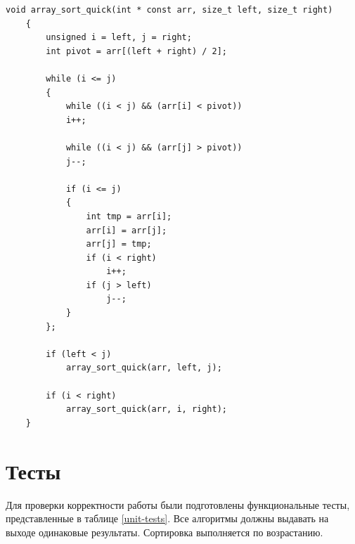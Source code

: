 \documentclass[12pt, a4paper]{report}
\begin{document}
	\begin{lstlisting}[label=code-quick,caption=Быстрая сортировка]
	void array_sort_quick(int * const arr, size_t left, size_t right)
	{
		unsigned i = left, j = right;
		int pivot = arr[(left + right) / 2];
		
		while (i <= j)
		{
			while ((i < j) && (arr[i] < pivot))
			i++;
		
			while ((i < j) && (arr[j] > pivot))
			j--;
		
			if (i <= j)
			{
				int tmp = arr[i];
				arr[i] = arr[j];
				arr[j] = tmp;
				if (i < right)
					i++;
				if (j > left)
					j--;
			}
		};
		
		if (left < j)
			array_sort_quick(arr, left, j);
		
		if (i < right)
			array_sort_quick(arr, i, right);
	}
	\end{lstlisting}

	\section{Тесты}
	Для проверки корректности работы были подготовлены функциональные тесты, представленные в таблице \ref{unit-tests}. Все алгоритмы должны выдавать на выходе одинаковые результаты. Сортировка выполняется по возрастанию.
\end{document}
